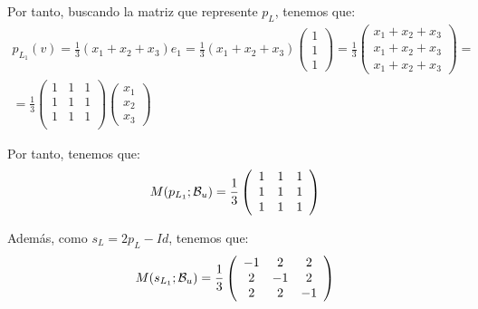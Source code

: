 \begin{ejercicio}
\begin{enumerate}
\begin{enumerate}
        Por tanto, buscando la matriz que represente $p_L$, tenemos que:
        \begin{multline*}
            p_{L_1}(v)=\frac{1}{3}(x_1 + x_2 + x_3)e_1
            =\frac{1}{3}(x_1 + x_2 + x_3)\left(\begin{array}{c}
                 1 \\ 1 \\ 1
            \end{array}\right)
            =\frac{1}{3}\left(\begin{array}{c}
                 x_1 + x_2 + x_3 \\ x_1 + x_2 + x_3 \\ x_1 + x_2 + x_3
            \end{array}\right) =\\
            =\frac{1}{3}\left(\begin{array}{ccc}
                 1 & 1 & 1 \\
                 1 & 1 & 1 \\
                 1 & 1 & 1 \\
            \end{array}\right)\left(\begin{array}{c}
                 x_1 \\ x_2 \\ x_3
            \end{array}\right)
        \end{multline*}
        
        Por tanto, tenemos que:
        \begin{equation*}
            M(p_{L_1};\mathcal{B}_u)=\frac{1}{3}\left(\begin{array}{ccc}
                 1 & 1 & 1 \\
                 1 & 1 & 1 \\
                 1 & 1 & 1 \\
            \end{array}\right)
        \end{equation*}

        Además, como $s_L = 2p_L - Id$, tenemos que:
        \begin{equation*}
            M(s_{L_1};\mathcal{B}_u)=\frac{1}{3}\left(\begin{array}{ccc}
                 -1 & 2 & 2 \\
                 2 & -1 & 2 \\
                 2 & 2 & -1 \\
            \end{array}\right)
        \end{equation*}




\end{enumerate}
\end{enumerate}
\end{ejercicio}
